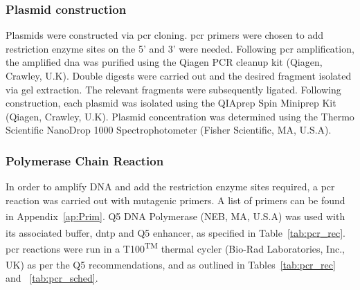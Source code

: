 \subsubsection{Plasmid construction}

Plasmids were constructed via \acrshort{pcr} cloning. \acrshort{pcr} primers were chosen to add restriction enzyme sites on the 5' and 3' were needed. Following \acrshort{pcr} amplification, the amplified \acrshort{dna} was purified using the Qiagen PCR cleanup kit (Qiagen, Crawley, U.K). Double digests were carried out and the desired fragment isolated via gel extraction. The relevant fragments were subsequently ligated. Following construction, each plasmid was isolated using the QIAprep Spin Miniprep Kit (Qiagen, Crawley, U.K). Plasmid concentration was determined using the Thermo Scientific NanoDrop 1000 Spectrophotometer (Fisher Scientific, MA, U.S.A).

\subsubsection{Polymerase Chain Reaction}
\label{sec:pcr}
In order to amplify DNA and add the restriction enzyme sites required, a \acrfull{pcr} reaction was carried out with mutagenic primers. A list of primers can be found in Appendix~\ref{ap:Prim}. Q5\textsuperscript{\textregistered} DNA Polymerase (NEB, MA, U.S.A) was used with its associated buffer, \acrshort{dntp} and Q5\textsuperscript{\textregistered} enhancer, as specified in Table~\ref{tab:pcr_rec}. \acrshort{pcr} reactions were run in a T100\textsuperscript{TM} thermal cycler (Bio-Rad Laboratories, Inc., UK) as per the Q5\textsuperscript{\textregistered} recommendations, and as outlined in Tables~\ref{tab:pcr_rec} and ~\ref{tab:pcr_sched}.

